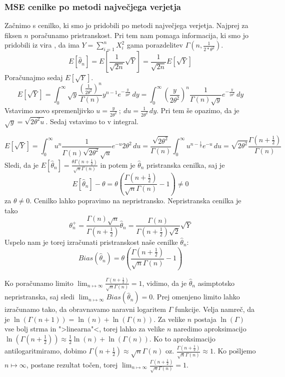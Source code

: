 \documentclass[a4paper, 10pt]{article}
\begin{document}
	\subsubsection{MSE cenilke po metodi največjega verjetja}\label{subsubsect: 2C1}
	Začnimo s cenilko, ki smo jo pridobili po metodi največjega verjetja. Najprej za fiksen $n$ poračunamo pristranskost. Pri tem nam pomaga informacija, ki smo jo pridobili iz vira \cite{bib:Rayleigh}, da ima $Y = \sum_{i = 1}^{n} X_i^2$ gama porazdelitev $\Gamma(n, \frac{1}{2*\theta^2})$.
	\begin{equation*}
		E[\widehat{\theta}_n] = E[\frac{1}{\sqrt{2n}}\sqrt{Y}] = \frac{1}{\sqrt{2n}} E[\sqrt{Y}]
	\end{equation*}
	Poračunajmo sedaj $E[\sqrt{Y}]$.
	\begin{equation*}
		E[\sqrt{Y}] =  \int_{0}^{\infty}\sqrt{y}\frac{(\frac{1}{2\theta^2})^n}{\Gamma(n)}y^{n-1}e^{-\frac{y}{2\theta^2}}\, dy = \int_{0}^{\infty}(\frac{y}{2\theta^{2}})^n\frac{1}{\Gamma(n)\sqrt{y}} e^{-\frac{y}{2\theta^2}}\,dy
	\end{equation*}
	Vstavimo novo spremenljivko $u = \frac{y}{2\theta^2}~;~du = \frac{1}{2\theta^2}\, dy$. Pri tem še opazimo, da je $\sqrt{y} = \sqrt{2\theta^2 u}$. Sedaj vstavimo to v integral.
	
	\begin{equation*}
		E[\sqrt{Y}] = \int_{0}^{\infty} u^n \frac{1}{\Gamma(n)\sqrt{2\theta^2}\sqrt{u}} e^{-u} 2\theta^2\,du = \frac{\sqrt{2\theta^2}}{\Gamma(n)} \int_{0}^{\infty} u^{n - \frac{1}{2}} e^{-u}\,du = \sqrt{2\theta^2}\frac{\Gamma(n+\frac{1}{2})}{\Gamma(n)}
	\end{equation*}
	Sledi, da je $E[\widehat{\theta}_n] = \frac{\theta\Gamma(n + \frac{1}{2})}{\sqrt{n}\Gamma(n)}$ in potem je $\widehat{\theta}_n$ pristranska cenilka, saj je $$E[\widehat{\theta}_n] - \theta = \theta (\frac{\Gamma(n + \frac{1}{2})}{\sqrt{n}\Gamma(n)} - 1) \neq 0$$ za $\theta\neq 0$. Cenilko lahko popravimo na nepristransko. Nepristranska cenilka je tako $$\theta_n^+ = \frac{\Gamma(n)\sqrt{n}}{\Gamma(n + \frac{1}{2})}\widehat{\theta}_n = \frac{\Gamma(n)}{\Gamma(n + \frac{1}{2})\sqrt{2}}\sqrt{Y}$$
	Uspelo nam je torej izračunati pristranskost naše cenilke $\widehat{\theta}_n$: $$Bias(\widehat{\theta}_n) = \theta(\frac{\Gamma(n + \frac{1}{2})}{\sqrt{n}\Gamma(n)} - 1)$$
	
	Ko poračunamo limito $\lim_{n\mapsto\infty} \frac{\Gamma(n + \frac{1}{2})}{\sqrt{n}\Gamma(n)} = 1$, vidimo, da je $\widehat{\theta}_n$ asimptotsko nepristranska, saj sledi $\lim_{n\mapsto\infty}Bias(\widehat{\theta}_n) = 0$. Prej omenjeno limito lahko izračunamo tako, da obravnavamo naravni logaritem $\Gamma$ funkcije. Velja namreč, da je $\ln(\Gamma(n+1)) = \ln(n) + \ln(\Gamma(n))$. Za velike $n$ postaja $\ln(\Gamma)$ vse bolj strma in ">linearna"<, torej lahko za velike $n$ naredimo aproksimacijo $\ln(\Gamma(n + \frac{1}{2})) \approx \frac{1}{2}\ln(n) + \ln(\Gamma(n))$. Ko to aproksimacijo antilogaritmiramo, dobimo $\Gamma(n + \frac{1}{2}) \approx \sqrt{n}\Gamma(n)$ oz. $\frac{\Gamma(n + \frac{1}{2})}{\sqrt{n}\Gamma(n)}\approx 1$. Ko pošljemo $n\mapsto\infty$, postane rezultat točen, torej $\lim_{n\mapsto\infty} \frac{\Gamma(n + \frac{1}{2})}{\sqrt{n}\Gamma(n)} = 1$.
	
\end{document}
